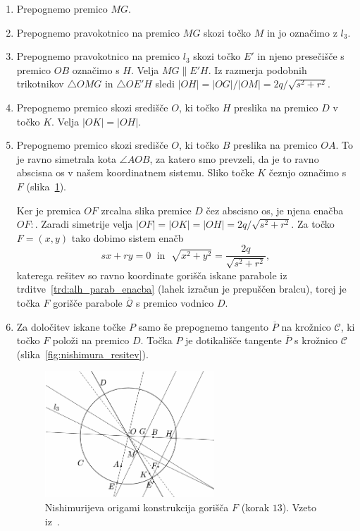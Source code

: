 \begin{enumerate}
    \item Prepognemo premico $MG$.
    \item Prepognemo pravokotnico na premico $MG$ skozi točko $M$ in jo označimo z $l_3$.
    \item Prepognemo pravokotnico na premico $l_3$ skozi točko $E'$ in njeno presečišče s premico $OB$ označimo s $H$. Velja $MG \parallel E'H$. Iz razmerja podobnih trikotnikov $\triangle OMG$ in $\triangle OE'H$ sledi $|OH|= |OG|/|OM| = 2q/ \sqrt{s^2+r^2}$.
    \item Prepognemo premico skozi središče $O$, ki točko $H$ preslika na premico $D$ v točko $K$. Velja $|OK| = |OH|$.
    \item Prepognemo premico skozi središče $O$, ki točko $B$ preslika na premico $OA$. To je ravno simetrala kota $\angle AOB$, za katero smo prevzeli, da je to ravno abscisna os v našem koordinatnem sistemu. Sliko točke $K$ čeznjo označimo s $F$ (slika~\ref{fig:nishimura_origami2}).
    
    Ker je premica $OF$ zrcalna slika premice $D$ čez abscisno os, je njena enačba $OF: $. Zaradi simetrije velja $|OF| = |OK| = |OH| = 2q/ \sqrt{s^2+r^2}$. Za točko $F = (x,y)$ tako dobimo sistem enačb
    $$ sx+ry=0 \; \text{ in } \; \sqrt{x^2+y^2} = \frac{2q}{\sqrt{s^2+r^2}},$$
    katerega rešitev so ravno koordinate gorišča iskane parabole iz trditve~\ref{trd:alh_parab_enacba} (lahek izračun je prepuščen bralcu), torej je točka $F$ gorišče parabole $\mathcal{\overline{Q}}$ s premico vodnico $D$.
    
    \item Za določitev iskane točke $P$ samo še prepognemo tangento $\overline{P}$ na krožnico $\mathcal{C}$, ki točko $F$ položi na premico $D$. Točka $P$ je dotikališče tangente $\overline{P}$ s krožnico $\mathcal{C}$ (slika~\ref{fig:nishimura_resitev}).
    \begin{figure}[h]
        \centering
        \includegraphics[width=0.6\textwidth]{images/alhazen/nishimura_origami2.png}
        \caption[Nishimurijeva konstrukcija $2$]{Nishimurijeva origami konstrukcija gorišča $F$ (korak $13$). Vzeto iz~\cite[str.\ 42]{nishimura2018}.}
        \label{fig:nishimura_origami2}
    \end{figure}
\end{enumerate}